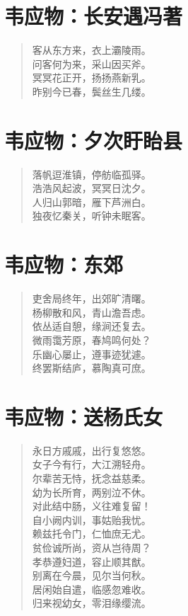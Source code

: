 \documentclass[12pt,oneside]{book}
\newenvironment{shici}{
\begin{verse}
\centering\large\hspace{12pt}}
{\end{verse}}
\begin{document}
\chapter{韦应物：长安遇冯著}
\begin{shici}
客从东方来，衣上灞陵雨。\\
问客何为来，采山因买斧。\\
冥冥花正开，扬扬燕新乳。\\
昨别今已春，鬓丝生几缕。
\end{shici}

\chapter{韦应物：夕次盱眙县}
\begin{shici}
落帆逗淮镇，停舫临孤驿。\\
浩浩风起波，冥冥日沈夕。\\
人归山郭暗，雁下芦洲白。\\
独夜忆秦关，听钟未眠客。
\end{shici}

\chapter{韦应物：东郊}
\begin{shici}
吏舍局终年，出郊旷清曙。\\
杨柳散和风，青山澹吾虑。\\
依丛适自憩，缘涧还复去。\\
微雨霭芳原，春鸠鸣何处？\\
乐幽心屡止，遵事迹犹遽。\\
终罢斯结庐，慕陶真可庶。
\end{shici}

\chapter{韦应物：送杨氏女}
\begin{shici}
永日方戚戚，出行复悠悠。\\
女子今有行，大江溯轻舟。\\
尔辈苦无恃，抚念益慈柔。\\
幼为长所育，两别泣不休。\\
对此结中肠，义往难复留！\\
自小阙内训，事姑贻我忧。\\
赖兹托令门，仁恤庶无尤。\\
贫俭诚所尚，资从岂待周？\\
孝恭遵妇道，容止顺其猷。\\
别离在今晨，见尔当何秋。\\
居闲始自遣，临感忽难收。\\
归来视幼女，零泪缘缨流。
\end{shici}
\end{document}

